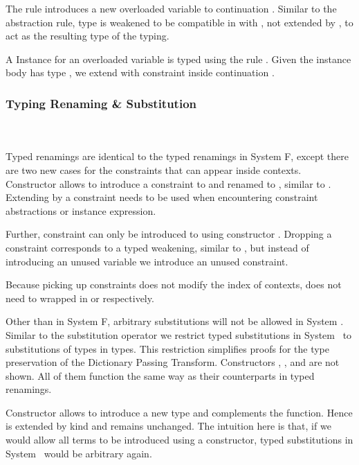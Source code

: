\noindent The rule  introduces a new overloaded variable to continuation . Similar to the abstraction rule, type  is weakened to be compatible in  with , not extended by , to act as the resulting type of the typing.

\noindent A Instance for an overloaded variable  is typed using the rule . Given the instance body  has type , we extend  with constraint   \Constr{:}  inside continuation . 

\subsubsection{Typing Renaming \& Substitution}\hfill\\\\
Typed renamings are identical to the typed renamings in System F, except there are two new cases for the constraints that can appear inside contexts. 
\FoRenTyping
Constructor  allows to introduce a constraint  to  and renamed  to , similar to . Extending by a constraint needs to be used when encountering constraint abstractions or instance expression. 

\noindent Further, constraint  \Constr{:}  can only be introduced to  using constructor . 
Dropping a constraint corresponds to a typed weakening, similar to , but instead of introducing an unused variable we introduce an unused constraint. 

\noindent  Because picking up constraints does not modify the index  of contexts,  does not need to wrapped in  or  respectively.

\noindent Other than in System F, arbitrary substitutions will not be allowed in System \Fo. 
Similar to the substitution operator we restrict typed substitutions in System \Fo\ to substitutions of types in types. This restriction simplifies proofs for the type preservation of the Dictionary Passing Transform.
\FoSubTyping
Constructors , ,  and  are not shown. All of them function the same way as their counterparts in typed renamings.

\noindent  Constructor  allows to introduce a new type  and complements the  function. Hence  is extended by kind  and  remains unchanged. The intuition here is that, if we would allow all terms to be introduced using a  constructor, typed substitutions in System \Fo\ would be arbitrary again.
